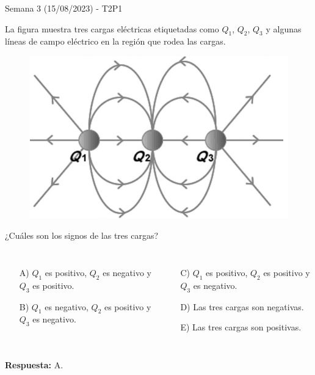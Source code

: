 \begin{frame}{Semana 3 (15/08/2023) - T2P1}

    La figura muestra tres cargas eléctricas etiquetadas como $Q_1$, $Q_2$, $Q_3$ y algunas líneas de campo eléctrico en la región que rodea las cargas.
    
    \begin{figure}[H]
        \centering
        \includegraphics[scale=0.2]{figures/t2p1.png}
    \end{figure}
    
    ¿Cuáles son los signos de las tres cargas?
    
    \begin{columns}
    \begin{itemize}
        \item[A)] $Q_1$ es positivo, $Q_2$ es negativo y $Q_3$ es positivo.
        \item[B)] $Q_1$ es negativo, $Q_2$ es positivo y $Q_3$ es negativo.
    \end{itemize}
    \begin{itemize}
        \item[C)] $Q_1$ es positivo, $Q_2$ es positivo y $Q_3$ es negativo.
        \item[D)] Las tres cargas son negativas.
        \item[E)] Las tres cargas son positivas.
    \end{itemize}
    
    \end{columns}
    
    \pause\bigskip\centering\textbf{Respuesta:} A.
    
\end{frame}

